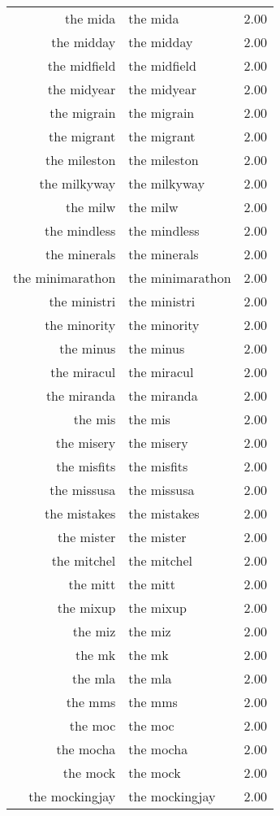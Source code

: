 \begin{table}[ht]
\begin{tabular}{rlr}
  the mida & the mida & 2.00 \\ 
  the midday & the midday & 2.00 \\ 
  the midfield & the midfield & 2.00 \\ 
  the midyear & the midyear & 2.00 \\ 
  the migrain & the migrain & 2.00 \\ 
  the migrant & the migrant & 2.00 \\ 
  the mileston & the mileston & 2.00 \\ 
  the milkyway & the milkyway & 2.00 \\ 
  the milw & the milw & 2.00 \\ 
  the mindless & the mindless & 2.00 \\ 
  the minerals & the minerals & 2.00 \\ 
  the minimarathon & the minimarathon & 2.00 \\ 
  the ministri & the ministri & 2.00 \\ 
  the minority & the minority & 2.00 \\ 
  the minus & the minus & 2.00 \\ 
  the miracul & the miracul & 2.00 \\ 
  the miranda & the miranda & 2.00 \\ 
  the mis & the mis & 2.00 \\ 
  the misery & the misery & 2.00 \\ 
  the misfits & the misfits & 2.00 \\ 
  the missusa & the missusa & 2.00 \\ 
  the mistakes & the mistakes & 2.00 \\ 
  the mister & the mister & 2.00 \\ 
  the mitchel & the mitchel & 2.00 \\ 
  the mitt & the mitt & 2.00 \\ 
  the mixup & the mixup & 2.00 \\ 
  the miz & the miz & 2.00 \\ 
  the mk & the mk & 2.00 \\ 
  the mla & the mla & 2.00 \\ 
  the mms & the mms & 2.00 \\ 
  the moc & the moc & 2.00 \\ 
  the mocha & the mocha & 2.00 \\ 
  the mock & the mock & 2.00 \\ 
  the mockingjay & the mockingjay & 2.00 \\ 

\end{tabular}
\end{table}
